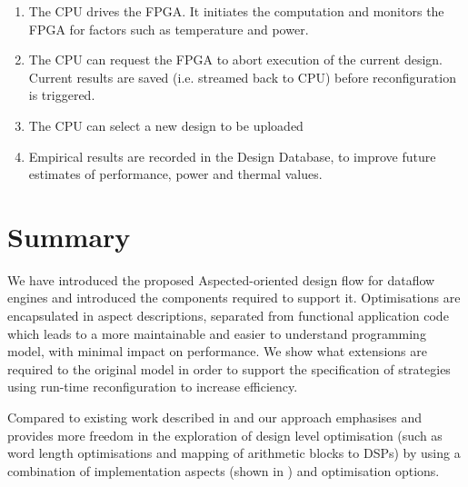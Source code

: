 \begin{enumerate}
\item The CPU drives the FPGA. It initiates the computation and
  monitors the FPGA for factors such as temperature and power.
\item The CPU can request the FPGA to abort execution of the current
  design. Current results are saved (i.e. streamed back to CPU)
  before reconfiguration is triggered.
\item The CPU can select a new design to be uploaded
\item Empirical results are recorded in the Design Database, to
  improve future estimates of performance, power and thermal values.
\end{enumerate}

\section{Summary}

We have introduced the proposed Aspected-oriented design flow for
dataflow engines and introduced the components required to support
it. Optimisations are encapsulated in aspect descriptions, separated
from functional application code which leads to a more maintainable
and easier to understand programming model, with minimal impact on
performance. We show what extensions are required to the original
model in order to support the specification of strategies using
run-time reconfiguration to increase efficiency.

Compared to existing work described in
\cite{Cardoso:Teixeira:Alves:Nobre:Diniz:Cutinho:Luk:2012} and
\cite{cardoso2011new} our approach emphasises and provides more
freedom in the exploration of design level optimisation (such as word
length optimisations and mapping of arithmetic blocks to DSPs) by
using a combination of implementation aspects (shown in
) and \FAST{} optimisation options.

